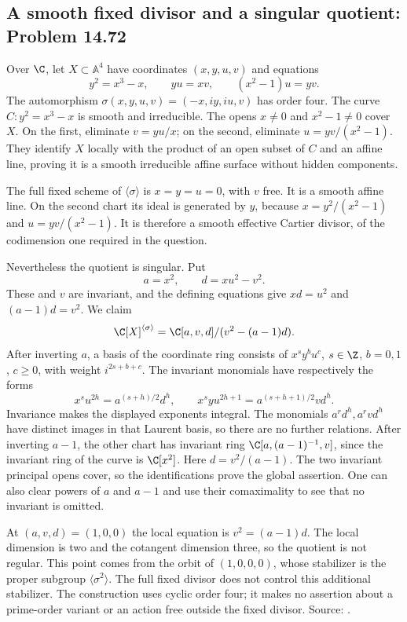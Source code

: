 \subsection{A smooth fixed divisor and a singular quotient: Problem 14.72}
\label{cand:14.72}

Over \(\C\), let \(X\subset\mathbb A^4\) have coordinates
\((x,y,u,v)\) and equations
\[
 y^2=x^3-x,\qquad yu=xv,\qquad (x^2-1)u=yv.
\]
The automorphism
\(\sigma(x,y,u,v)=(-x,iy,iu,v)\) has order four.
The curve \(C:y^2=x^3-x\) is smooth and irreducible.
The opens \(x\ne0\) and \(x^2-1\ne0\) cover \(X\).
On the first, eliminate \(v=yu/x\); on the second,
eliminate \(u=yv/(x^2-1)\). They identify \(X\)
locally with the product of an open subset of \(C\)
and an affine line, proving it is a smooth irreducible
affine surface without hidden components.

The full fixed scheme of \(\langle\sigma\rangle\) is
\(x=y=u=0\), with \(v\) free. It is a smooth affine
line. On the second chart its ideal is generated by
\(y\), because \(x=y^2/(x^2-1)\) and
\(u=yv/(x^2-1)\). It is therefore a smooth effective
Cartier divisor, of the codimension one required in
the question.

Nevertheless the quotient is singular. Put
\[
 a=x^2,\qquad d=xu^2-v^2.
\]
These and \(v\) are invariant, and the defining equations
give \(xd=u^2\) and \((a-1)d=v^2\). We claim
\[
 \C[X]^{\langle\sigma\rangle}
       =\C[a,v,d]/(v^2-(a-1)d).
\]
After inverting \(a\), a basis of the coordinate ring
consists of \(x^s y^b u^c\), \(s\in\Z\), \(b=0,1\),
\(c\geq0\), with weight \(i^{2s+b+c}\).
The invariant monomials have respectively the forms
\[
 x^s u^{2h}=a^{(s+h)/2}d^h,\qquad
 x^s y u^{2h+1}=a^{(s+h+1)/2}vd^h.
\]
Invariance makes the displayed exponents integral.
The monomials \(a^r d^h,a^r v d^h\) have distinct
images in that Laurent basis, so there are no
further relations. After inverting \(a-1\), the other
chart has invariant ring
\(\C[a,(a-1)^{-1},v]\), since the invariant ring of
the curve is \(\C[x^2]\). Here \(d=v^2/(a-1)\).
The two invariant principal opens cover, so the
identifications prove the global assertion. One can
also clear powers of \(a\) and \(a-1\) and use their
comaximality to see that no invariant is omitted.

At \((a,v,d)=(1,0,0)\) the local equation is
\(v^2=(a-1)d\). The local dimension is two and the
cotangent dimension three, so the quotient is not
regular. This point comes from the orbit of
\((1,0,0,0)\), whose stabilizer is the proper subgroup
\(\langle\sigma^2\rangle\). The full fixed divisor
does not control this additional stabilizer.
The construction uses cyclic order four; it makes
no assertion about a prime-order variant or an action
free outside the fixed divisor. Source:
.

